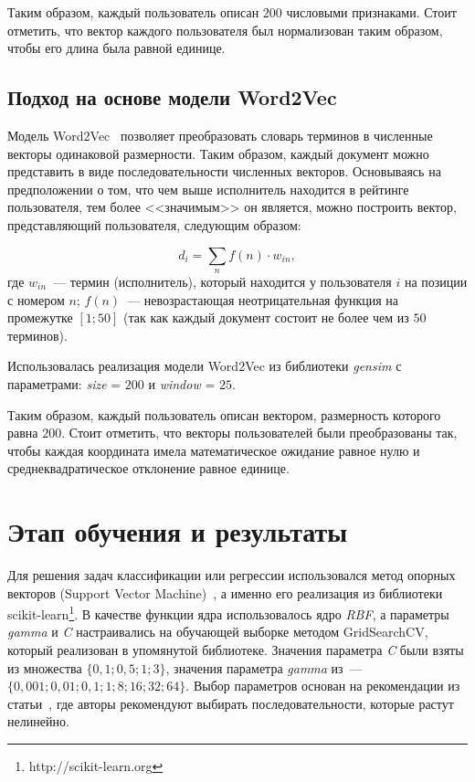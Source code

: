 \documentclass{spisok-article}
\begin{document}
Таким образом, каждый пользователь описан $200$ числовыми признаками. 
Стоит отметить, что вектор каждого пользователя был 
нормализован таким образом, чтобы его длина была равной единице.

\subsection{Подход на основе модели Word2Vec}
Модель Word2Vec~\cite{word2vec} позволяет преобразовать словарь
терминов в численные векторы одинаковой размерности. Таким
образом, каждый документ можно представить в виде
последовательности численных векторов. Основываясь на
предположении о том, что чем выше исполнитель находится в
рейтинге пользователя, тем более <<значимым>> он является,
можно построить вектор, представляющий пользователя, следующим
образом:

\begin{equation} \label{eq:doc2vec}
    d_{i} = \sum_{n}{f(n) \cdot w_{in}},
\end{equation}
где $w_{in}$~--- термин (исполнитель), который находится
у пользователя $i$ на позиции с номером $n$; $f(n)$~---
невозрастающая неотрицательная функция на промежутке $[1; 50]$
(так как каждый документ состоит не более чем из $50$ терминов).

Использовалась реализация модели Word2Vec из 
библиотеки \textit{gensim} с параметрами:
\textit{size} = $200$ и \textit{window} = $25$.

Таким образом, каждый пользователь описан вектором,
размерность которого равна $200$. Стоит отметить, что 
векторы пользователей были преобразованы так, чтобы
каждая координата имела математическое ожидание равное нулю и
среднеквадратическое отклонение равное единице.


\section{Этап обучения и результаты}

Для решения задач классификации или регрессии использовался
метод опорных векторов (Support Vector Machine)~\cite{svm},
а именно его реализация
из библиотеки scikit-learn\footnote{http://scikit-learn.org}.
В качестве функции ядра использовалось ядро \textit{RBF}, а параметры
\textit{gamma} и \textit{C} настраивались на обучающей выборке
методом GridSearchCV, который реализован в упомянутой библиотеке.
Значения параметра \textit{C} были взяты из множества
$\{0{,}1; 0{,}5; 1; 3\}$, значения параметра \textit{gamma} из~--- 
$\{0{,}001; 0{,}01; 0{,}1; 1; 8; 16; 32; 64\}$. Выбор параметров
основан на рекомендации из статьи~\cite{svm2003recom}, где
авторы рекомендуют выбирать последовательности, которые растут нелинейно.
\end{document}
